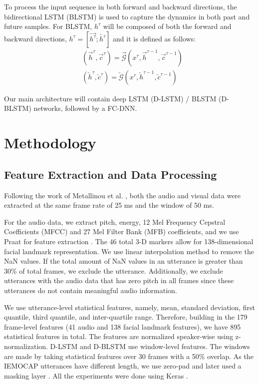 To process the input sequence in both forward and backward directions, the bidirectional LSTM (BLSTM) is used to capture the dynamics in both past and future samples.
For BLSTM, $h^\tau$ will be composed of both the forward and backward directions, $h^\tau = [\overrightarrow{h^\tau}; \overleftarrow{h^\tau}]$ and it is defined as follows:
\begin{align}
& (\overrightarrow{h}^\tau, \overrightarrow{c}^\tau) = \overrightarrow{\mathcal{G}}(x^\tau, \overrightarrow{h}^{\tau-1}, \overrightarrow{c}^{\tau-1}) \\
& (\overleftarrow{h}^\tau, \overleftarrow{c}^\tau) = \overleftarrow{\mathcal{G}}(x^\tau, \overleftarrow{h}^{\tau-1}, \overleftarrow{c}^{\tau-1})
\end{align}

Our main architecture will contain deep LSTM (D-LSTM) / BLSTM (D-BLSTM) networks, followed by a FC-DNN. 


\newpage
\chapter{Methodology}
\label{methodology}

\section{Feature Extraction and Data Processing}
Following the work of Metallinou et al. \cite{Meta}, both the audio and visual data were extracted at the same frame rate of 25 ms and the window of 50 ms. 

For the audio data, we extract pitch, energy, 12 Mel Frequency Cepstral Coefficients (MFCC) and 27 Mel Filter Bank (MFB) coefficients, and we use Praat for  feature extraction \cite{praat}.  The 46 total 3-D markers allow for 138-dimensional facial landmark representation. We use linear interpolation method to remove the NaN values. If the total amount of NaN values in an utterance is greater than 30\% of total frames, we exclude the utterance. Additionally, we exclude utterances with the audio data that has zero pitch in all frames since these utterances do not contain meaningful audio information.

We use utterance-level statistical features, namely, mean, standard deviation, first quantile, third quantile, and inter-quartile range. Therefore, building in the 179 frame-level features (41 audio and 138 facial landmark features), we have 895 statistical features in total. The features are normalized speaker-wise using z-normalization. D-LSTM and D-BLSTM use  window-level features. The windows are made by taking statistical features over 30 frames  with a 50\% overlap. As the IEMOCAP utterances have different length, we use zero-pad and later used a masking layer \cite{keras}. All the experiments were done using Keras \cite{keras}. 

